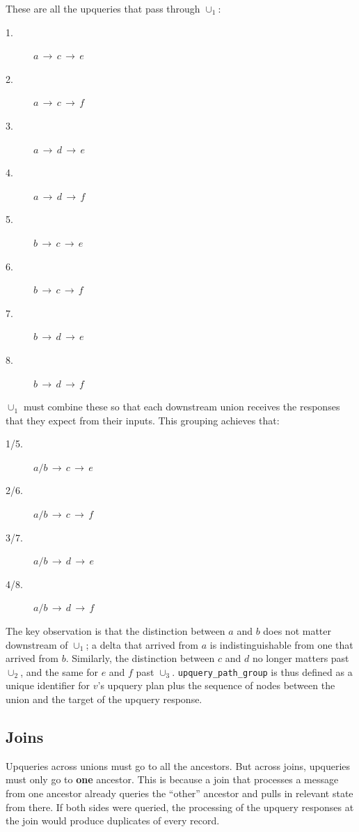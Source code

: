 These are all the upqueries that pass through $\cup_1$:
        
\begin{multicols}{4}
\begin{description}
  \item [1.] $a\,\to\,c\,\to\,e$
  \item [2.] $a\,\to\,c\,\to\,f$
  \item [3.] $a\,\to\,d\,\to\,e$
  \item [4.] $a\,\to\,d\,\to\,f$
  \item [5.] $b\,\to\,c\,\to\,e$
  \item [6.] $b\,\to\,c\,\to\,f$
  \item [7.] $b\,\to\,d\,\to\,e$
  \item [8.] $b\,\to\,d\,\to\,f$
\end{description}
\end{multicols}

$\cup_1$ must combine these so that each downstream union receives the responses
that they expect from their inputs. This grouping achieves that:

\begin{multicols}{2}
\begin{description}
  \item [1/5.] $a/b\,\to\,c\,\to\,e$
  \item [2/6.] $a/b\,\to\,c\,\to\,f$
  \item [3/7.] $a/b\,\to\,d\,\to\,e$
  \item [4/8.] $a/b\,\to\,d\,\to\,f$
\end{description}
\end{multicols}

The key observation is that the distinction between $a$ and $b$ does not matter
downstream of $\cup_1$; a delta that arrived from $a$ is indistinguishable from
one that arrived from $b$. Similarly, the distinction between $c$ and $d$ no
longer matters past $\cup_2$, and the same for $e$ and $f$ past $\cup_3$.
\texttt{upquery\_path\_group} is thus defined as a unique identifier for $v$'s
upquery plan plus the sequence of nodes between the union and the target of the
upquery response.

\subsection{Joins}

Upqueries across unions must go to all the ancestors. But across joins,
upqueries must only go to \textbf{one} ancestor. This is because a join that
processes a message from one ancestor already queries the ``other'' ancestor and
pulls in relevant state from there. If both sides were queried, the processing
of the upquery responses at the join would produce duplicates of every record.

